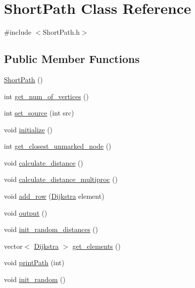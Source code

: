 \hypertarget{class_short_path}{\section{Short\-Path Class Reference}
\label{class_short_path}
}


{\ttfamily \#include $<$Short\-Path.\-h$>$}

\subsection*{Public Member Functions}
\begin{DoxyCompactItemize}
\item 
\hyperlink{class_short_path_aa1f54b3eb632252e0e4f34fed4110d54}{Short\-Path} ()
\item 
int \hyperlink{class_short_path_a04ad21508536061dc0f83aafa2fe25f3}{get\-\_\-num\-\_\-of\-\_\-vertices} ()
\item 
int \hyperlink{class_short_path_a82c56315bdb4245a028a060ab63dd866}{set\-\_\-source} (int src)
\item 
void \hyperlink{class_short_path_a113f044a61c1eacafb73df55e12f3803}{initialize} ()
\item 
int \hyperlink{class_short_path_ae218a65d8dd2620afc8c088679c5ab98}{get\-\_\-closest\-\_\-unmarked\-\_\-node} ()
\item 
void \hyperlink{class_short_path_af4ddb3c9a160c273bdc99b3fb43fd58d}{calculate\-\_\-distance} ()
\item 
void \hyperlink{class_short_path_a74f3fa59ffd3e061ef75a7962fbe3cfa}{calculate\-\_\-distance\-\_\-multiproc} ()
\item 
void \hyperlink{class_short_path_af65d23be9601ccf34becf9922c88c263}{add\-\_\-row} (\hyperlink{class_dijkstra}{Dijkstra} element)
\item 
void \hyperlink{class_short_path_aa4ede1b3713f60bef1f23193510199df}{output} ()
\item 
void \hyperlink{class_short_path_a24387db998bac1e88493dc4cf838a68b}{init\-\_\-random\-\_\-distances} ()
\item 
vector$<$ \hyperlink{class_dijkstra}{Dijkstra} $>$ \hyperlink{class_short_path_abf528c510136ea8014abfdd993949a02}{get\-\_\-elements} ()
\item 
void \hyperlink{class_short_path_a363cac67e1c10f524feab977073c35e9}{print\-Path} (int)
\item 
void \hyperlink{class_short_path_af3c6bd7d7b552ca6fa60b89a49db8566}{init\-\_\-random} ()
\item 

\end{DoxyCompactItemize}
